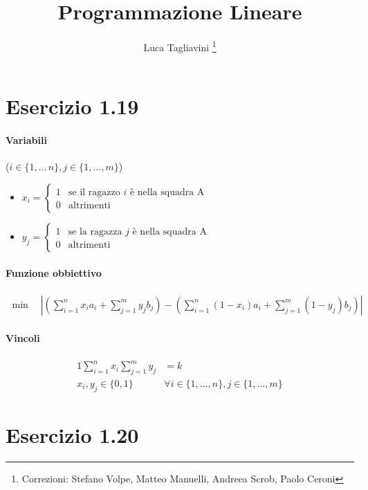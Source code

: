 \documentclass{article}
\title{Programmazione Lineare}
\author{Luca Tagliavini
  \thanks{Correzioni: Stefano Volpe, Matteo Manuelli, Andreea Scrob, Paolo Ceroni}
}
\begin{document}
\maketitle
\pagebreak
\tableofcontents
\pagebreak
{}

\section{Esercizio 1.19}

\paragraph{Variabili} ($i \in \{1,\ldots\,n\}, j \in \{1,\ldots,m\}$)
\begin{itemize}
  \item $x_i = \begin{cases}
    1 &\text{se il ragazzo }i\text{ \`e nella squadra A}\\
    0 &\text{altrimenti}
  \end{cases}$
  \item $y_j = \begin{cases}
    1 &\text{se la ragazza }j\text{ \`e nella squadra A}\\
    0 &\text{altrimenti}
  \end{cases}$
\end{itemize}

\paragraph{Funzione obbiettivo}
\begin{align*}
  \min \quad |(\sum_{i=1}^n x_i a_i + \sum_{j=1}^m y_j b_j) - (\sum_{i=1}^n (1-x_i) a_i + \sum_{j=1}^m (1-y_j) b_j)|
\end{align*}

\paragraph{Vincoli}
\begin{alignat}{1}
  \sum_{i=1}^n x_i \sum_{j=1}^m y_j &= k \\
  x_i, y_j \in \{0,1\} \qquad &\forall i \in \{1,\ldots,n\}, j \in \{1,\ldots,m\}
\end{alignat}

\pagebreak
\section{Esercizio 1.20}
\end{document}
